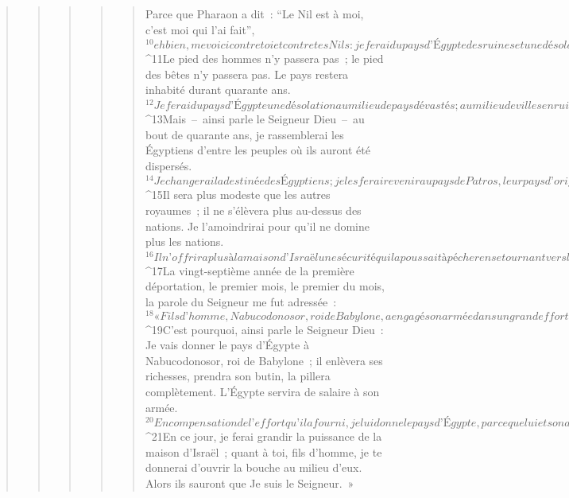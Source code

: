 \begin{verse}
\begin{verse}
\begin{verse}
\begin{verse}
\begin{verse}
      Parce que Pharaon a dit : “Le Nil est à moi, c’est moi qui l’ai fait”, 
${}^{10}eh bien, me voici contre toi et contre tes Nils : je ferai du pays d’Égypte des ruines et une désolation, de Migdol à Assouan et jusqu’à la frontière de l’Éthiopie. 
${}^{11}Le pied des hommes n’y passera pas ; le pied des bêtes n’y passera pas. Le pays restera inhabité durant quarante ans. 
${}^{12}Je ferai du pays d’Égypte une désolation au milieu de pays dévastés ; au milieu de villes en ruine, ses villes seront une désolation, durant quarante ans. Et je vais disperser les Égyptiens parmi les nations, les disséminer parmi les pays.
${}^{13}Mais – ainsi parle le Seigneur Dieu – au bout de quarante ans, je rassemblerai les Égyptiens d’entre les peuples où ils auront été dispersés. 
${}^{14}Je changerai la destinée des Égyptiens ; je les ferai revenir au pays de Patros, leur pays d’origine. Ils formeront un royaume modeste. 
${}^{15}Il sera plus modeste que les autres royaumes ; il ne s’élèvera plus au-dessus des nations. Je l’amoindrirai pour qu’il ne domine plus les nations. 
${}^{16}Il n’offrira plus à la maison d’Israël une sécurité qui la poussait à pécher en se tournant vers l’Égypte. Alors on saura que Je suis le Seigneur Dieu. »
       
${}^{17}La vingt-septième année de la première déportation, le premier mois, le premier du mois, la parole du Seigneur me fut adressée : 
${}^{18}« Fils d’homme, Nabucodonosor, roi de Babylone, a engagé son armée dans un grand effort contre Tyr : tous les crânes sont pelés, toutes les épaules écorchées, mais ni lui ni son armée n’ont retiré aucun salaire de Tyr pour l’effort qu’ils ont engagé contre la ville. 
${}^{19}C’est pourquoi, ainsi parle le Seigneur Dieu : Je vais donner le pays d’Égypte à Nabucodonosor, roi de Babylone ; il enlèvera ses richesses, prendra son butin, la pillera complètement. L’Égypte servira de salaire à son armée. 
${}^{20}En compensation de l’effort qu’il a fourni, je lui donne le pays d’Égypte, parce que lui et son armée ont travaillé pour moi – oracle du Seigneur Dieu. 
${}^{21}En ce jour, je ferai grandir la puissance de la maison d’Israël ; quant à toi, fils d’homme, je te donnerai d’ouvrir la bouche au milieu d’eux. Alors ils sauront que Je suis le Seigneur. »
      

\end{verse}
\end{verse}
\end{verse}
\end{verse}
\end{verse}
